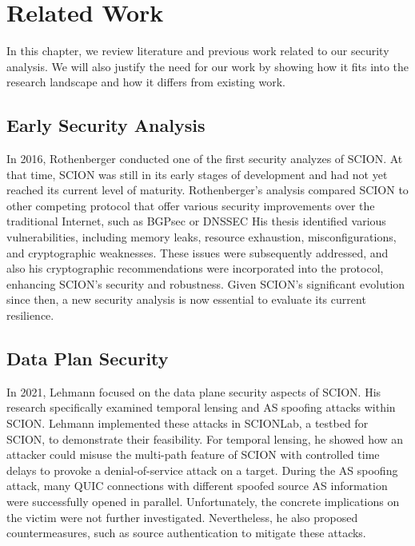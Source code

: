 \chapter{Related Work}
\label{ch:related-work}


In this chapter, we review literature and previous work related to our security analysis.
We will also justify the need for our work by showing how it fits into the research landscape and how it differs from existing work.

\section{Early Security Analysis}
In 2016, Rothenberger \cite{Rothenberger2016} conducted one of the first security analyzes of SCION.
At that time, SCION was still in its early stages of development and had not yet reached its current level of maturity.
Rothenberger's analysis compared SCION to other competing protocol that offer various security improvements over the traditional Internet, such as BGPsec or DNSSEC
His thesis identified various vulnerabilities, including memory leaks, resource exhaustion, misconfigurations, and cryptographic weaknesses.
These issues were subsequently addressed, and also his cryptographic recommendations were incorporated into the protocol, enhancing SCION's security and robustness.
Given SCION's significant evolution since then, a new security analysis is now essential to evaluate its current resilience.

\section{Data Plan Security}
In 2021, Lehmann \cite{Lehmann2021} focused on the data plane security aspects of SCION.
His research specifically examined temporal lensing and AS spoofing attacks within SCION.
Lehmann implemented these attacks in SCIONLab, a testbed for SCION, to demonstrate their feasibility.
For temporal lensing, he showed how an attacker could misuse the multi-path feature of SCION with controlled time delays to provoke a denial-of-service attack on a target.
During the AS spoofing attack, many QUIC connections with different spoofed source AS information were successfully opened in parallel.
Unfortunately, the concrete implications on the victim were not further investigated.
Nevertheless, he also proposed countermeasures, such as source authentication to mitigate these attacks.


